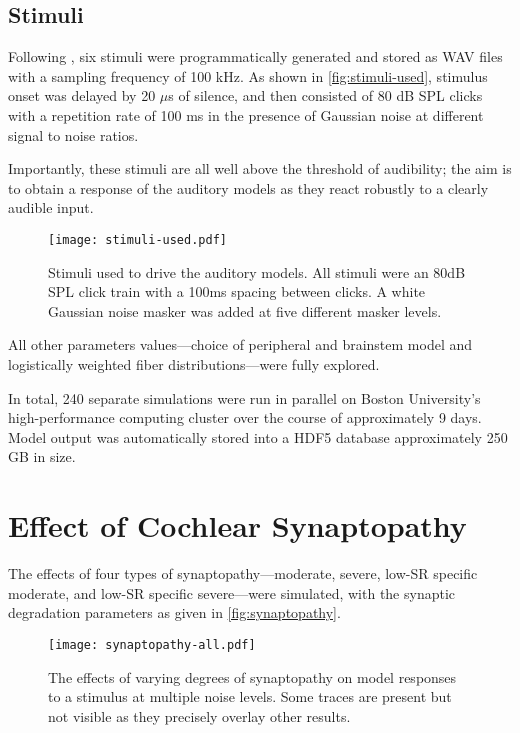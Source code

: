 \subsection{Stimuli} %
\label{sub:stimuli}
Following \citeauthor{Mehraei2015Auditory,Mehraei2016Auditory}, six stimuli were programmatically generated and stored as WAV files with a sampling frequency of 100 kHz.  As shown in \autoref{fig:stimuli-used}, stimulus onset was delayed by 20 $\mu$s of silence, and then consisted of 80 dB SPL clicks with a repetition rate of 100 ms in the presence of Gaussian noise at different signal to noise ratios. 

Importantly, these stimuli are all well above the threshold of audibility; the aim is to obtain a response of the auditory models as they react robustly to a clearly audible input. 

\begin{figure}[htbp]
	\centering
	\texttt{[image: stimuli-used.pdf]}
	\caption[Experimental Stimuli]{Stimuli used to drive the auditory models.  All stimuli were an 80dB SPL click train with a 100ms spacing between clicks.  A white Gaussian noise masker was added at five different masker levels.}
	\label{fig:stimuli-used}
\end{figure}

All other parameters values---choice of peripheral and brainstem model and logistically weighted fiber distributions---were fully explored.

In total, 240 separate simulations were run in parallel on Boston University's high-performance computing cluster over the course of approximately 9 days.  Model output was automatically stored into a HDF5 database approximately 250 GB in size.



\section{Effect of Cochlear Synaptopathy} %
\label{sec:effect_of_synaptopathy}
The effects of four types of synaptopathy---moderate, severe, low-SR specific moderate, and low-SR specific severe---were simulated, with the synaptic degradation parameters as given in \autoref{fig:synaptopathy}. 

\begin{figure}[htbp]
	\centering
	\texttt{[image: synaptopathy-all.pdf]}
	\caption[Effects of Synaptopathy]{The effects of varying degrees of synaptopathy on model responses to a stimulus at multiple noise levels.  Some traces are present but not visible as they precisely overlay other results.}
	\label{fig:synaptopathy_results}
\end{figure}

